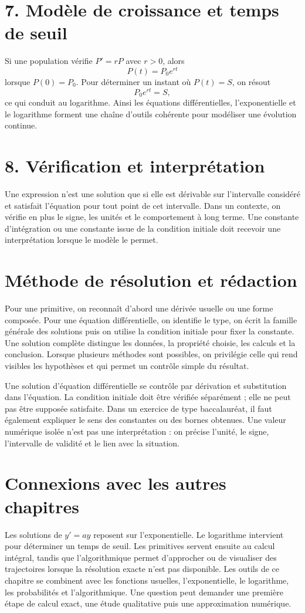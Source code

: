 \section{7. Modèle de croissance et temps de seuil}
Si une population vérifie $P'=rP$ avec $r>0$, alors
\[
P(t)=P_0e^{rt}
\]
lorsque $P(0)=P_0$. Pour déterminer un instant où $P(t)=S$, on résout
\[
P_0e^{rt}=S,
\]
ce qui conduit au logarithme. Ainsi les équations différentielles, l’exponentielle et le logarithme forment une chaîne d’outils cohérente pour modéliser une évolution continue.

\section{8. Vérification et interprétation}
Une expression n’est une solution que si elle est dérivable sur l’intervalle considéré et satisfait l’équation pour tout point de cet intervalle. Dans un contexte, on vérifie en plus le signe, les unités et le comportement à long terme. Une constante d’intégration ou une constante issue de la condition initiale doit recevoir une interprétation lorsque le modèle le permet.

\section{Méthode de résolution et rédaction}
Pour une primitive, on reconnaît d’abord une dérivée usuelle ou une forme composée. Pour une équation différentielle, on identifie le type, on écrit la famille générale des solutions puis on utilise la condition initiale pour fixer la constante.
Une solution complète distingue les données, la propriété choisie, les calculs et la conclusion. Lorsque plusieurs méthodes sont possibles, on privilégie celle qui rend visibles les hypothèses et qui permet un contrôle simple du résultat.

Une solution d’équation différentielle se contrôle par dérivation et substitution dans l’équation. La condition initiale doit être vérifiée séparément ; elle ne peut pas être supposée satisfaite.
Dans un exercice de type baccalauréat, il faut également expliquer le sens des constantes ou des bornes obtenues. Une valeur numérique isolée n’est pas une interprétation : on précise l’unité, le signe, l’intervalle de validité et le lien avec la situation.

\section{Connexions avec les autres chapitres}
Les solutions de $y'=ay$ reposent sur l’exponentielle. Le logarithme intervient pour déterminer un temps de seuil. Les primitives servent ensuite au calcul intégral, tandis que l’algorithmique permet d’approcher ou de visualiser des trajectoires lorsque la résolution exacte n’est pas disponible.
Les outils de ce chapitre se combinent avec les fonctions usuelles, l’exponentielle, le logarithme, les probabilités et l’algorithmique. Une question peut demander une première étape de calcul exact, une étude qualitative puis une approximation numérique.

